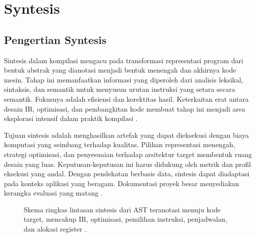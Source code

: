 \documentclass[../main.tex]{subfiles}
\begin{document}
\chapter{Syntesis}

\section{Pengertian Syntesis}
Sintesis dalam kompilasi mengacu pada transformasi representasi program dari bentuk abstrak yang dianotasi menjadi bentuk menengah dan akhirnya kode mesin. Tahap ini memanfaatkan informasi yang diperoleh dari analisis leksikal, sintaksis, dan semantik untuk menyusun urutan instruksi yang setara secara semantik. Fokusnya adalah efisiensi dan korektitas hasil. Keterkaitan erat antara desain IR, optimisasi, dan pembangkitan kode membuat tahap ini menjadi area eksplorasi intensif dalam praktik kompilasi \citep{LLVMOverview,WikiOptimization}.

Tujuan sintesis adalah menghasilkan artefak yang dapat dieksekusi dengan biaya komputasi yang seimbang terhadap kualitas. Pilihan representasi menengah, strategi optimisasi, dan penyesuaian terhadap arsitektur target membentuk ruang desain yang luas. Keputusan-keputusan ini harus didukung oleh metrik dan profil eksekusi yang andal. Dengan pendekatan berbasis data, sintesis dapat diadaptasi pada konteks aplikasi yang beragam. Dokumentasi proyek besar menyediakan kerangka evaluasi yang matang \citep{LLVMOverview}.

\begin{figure}[t]
  \centering
  \caption{Skema ringkas lintasan sintesis dari AST teranotasi menuju kode target, mencakup IR, optimisasi, pemilihan instruksi, penjadwalan, dan alokasi register \citep{LLVMOverview}.}
  \label{fig:synthesis-pipeline}
\end{figure}
\end{document}
